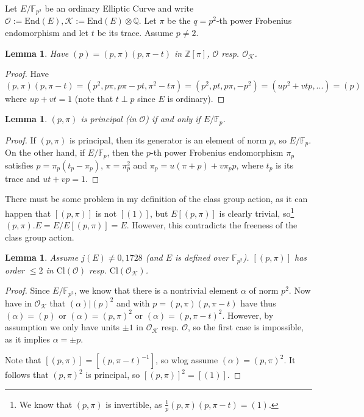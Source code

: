 \documentclass{scrartcl}
\newcommand{\Z}{\mathbb{Z}}
\newcommand{\F}{\mathbb{F}}
\newcommand{\End}{\mathrm{End}}
\newcommand{\Cl}{\mathrm{Cl}}
\newcommand{\K}{\mathcal{K}}
\renewcommand{\O}{\mathcal{O}}
\newtheorem{lemma}[prop]{Lemma}
\theoremstyle{definition}
\begin{document}
Let $E/\F_{p^2}$ be an ordinary Elliptic Curve and write $\O := \End(E), \K := \End(E) \otimes \mathbb{Q}$.
Let $\pi$ be the $q = p^2$-th power Frobenius endomorphism and let $t$ be its trace.
Assume $p \neq 2$.
\begin{lemma}
    Have $(p) = (p, \pi)(p, \pi - t)$ in $\Z[\pi]$, $\O$ resp. $\O_\K$.
\end{lemma}
\begin{proof}
    Have
    \begin{equation*}
        (p, \pi)(p, \pi - t) = (p^2, p\pi, p\pi - pt, \pi^2 - t\pi) = (p^2, pt, p\pi, -p^2) = (up^2 + vtp, ...) = (p)
    \end{equation*}
    where $up + vt = 1$ (note that $t \perp p$ since $E$ is ordinary).
\end{proof}
\begin{lemma}
    $(p, \pi)$ is principal (in $\O$) if and only if $E/\F_p$.
\end{lemma}
\begin{proof}
    If $(p, \pi)$ is principal, then its generator is an element of norm $p$, so $E/\F_p$.
    On the other hand, if $E/\F_p$, then the $p$-th power Frobenius endomorphism $\pi_p$ satisfies $p = \pi_p(t_p - \pi_p)$, $\pi = \pi_p^2$ and $\pi_p = u(\pi + p) + v\pi_p p$, where $t_p$ is its trace and $u t + v p = 1$.
\end{proof}
There must be some problem in my definition of the class group action, as it can happen that $[(p, \pi)]$ is not $[(1)]$, but $E[(p, \pi)]$ is clearly trivial, so\footnote{We know that $(p, \pi)$ is invertible, as $\frac 1 p (p, \pi)(p, \pi - t) = (1)$.} $(p, \pi).E = E/E[(p, \pi)] = E$.
However, this contradicts the freeness of the class group action.
\begin{lemma}
    \label{prop:p_split_order_2}
    Assume $j(E) \neq 0, 1728$ (and $E$ is defined over $\F_{p^2}$).
    $[(p, \pi)]$ has order $\leq 2$ in $\Cl(\O)$ resp. $\Cl(\O_\K)$.
\end{lemma}
\begin{proof}
    Since $E/\F_{p^2}$, we know that there is a nontrivial element $\alpha$ of norm $p^2$.
    Now have in $\O_\K$ that $(\alpha) | (p)^2$ and with $p = (p, \pi)(p, \pi - t)$ have thus $(\alpha) = (p)$ or $(\alpha) = (p, \pi)^2$ or $(\alpha) = (p, \pi - t)^2$.
    However, by assumption we only have units $\pm 1$ in $\O_\K$ resp. $\O$, so the first case is impossible, as it implies $\alpha = \pm p$.

    Note that $[(p, \pi)] = [(p, \pi - t)^{-1}]$, so wlog assume $(\alpha) = (p, \pi)^2$.
    It follows that $(p, \pi)^2$ is principal, so $[(p, \pi)]^2 = [(1)]$.
\end{proof}
\end{document}
